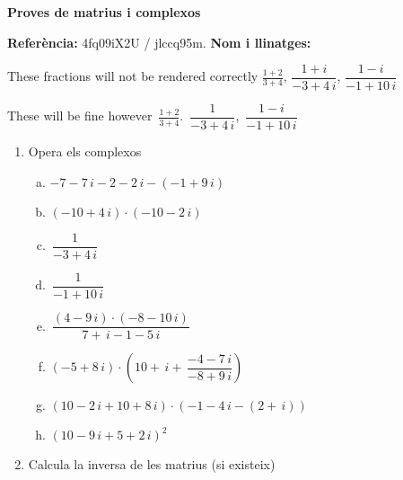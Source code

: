 \documentclass[a4paper]{article}
\begin{document}
  \begin{center}\large \textbf{ \color{blue} Proves de matrius i complexos} \end{center}
  \vspace{0.5cm}
  
  
   {\small \textbf{Referència:} 4fq09iX2U / jlccq95m.} \textbf{Nom i llinatges:} \dotfill
  
  
  {\large
  These fractions will not be rendered correctly $\frac{1+2}{3+4}$,   $\dfrac{1 + i}{-3 + 4\, i}$,
 $\dfrac{1-i}{-1 + 10\, i}$
  
  
  These  will be fine however $\, \frac{1+2}{3+4}$.   $\, \dfrac{1}{-3 + 4\, i}$,
  $\, \dfrac{1 -i}{-1 + 10\, i}$
  }
  
  
  \begin{enumerate}
      \item Opera els complexos
  
   \begin{enumerate}[a)]
        \item  $-7 - 7\, i -2 - 2\, i - \left( -1 + 9\, i\right)$
        \item  $\left( -10 + 4\, i\right) \cdot \left( -10 - 2\, i \right)$
        \item  $\, \dfrac{1}{-3 + 4\, i}$
        \item  $\, \dfrac{1}{-1 + 10\, i}$
        \item  $\, \dfrac{\left( 4 - 9\, i\right) \cdot \left( -8 - 10\, i \right)}{7 + \, i -1 - 5\, i}$
        \item  $\left(-5 + 8\, i\right) \cdot \left(10 + \, i + \, \dfrac{ -4 - 7\, i}{-8 + 9\, i} \right)$
        \item  $\left(10 - 2\, i+ 10 + 8\, i\right) \cdot \left( -1 - 4\, i- \left(2 + \, i\right) \right)$
        \item  $\left( 10 - 9\, i+ 5 + 2\, i \right)^{2}$
      \end{enumerate}
  
      \item Calcula la inversa de les matrius (si existeix)
  

\end{enumerate}
\end{document}
